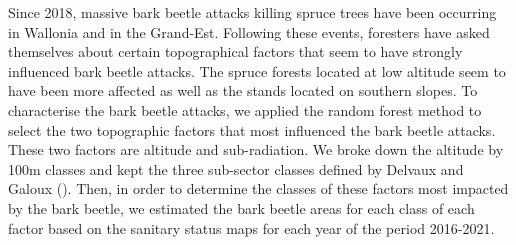 \documentclass[3p,times]{elsarticle}
\begin{document}









Since 2018, massive bark beetle attacks killing spruce trees have been occurring in Wallonia and in the Grand-Est. Following these events, foresters have asked themselves about certain topographical factors that seem to have strongly influenced bark beetle attacks. 
The spruce forests located at low altitude seem to have been more affected as well as the stands located on southern slopes.
To characterise the bark beetle attacks, we applied the random forest method to select the two topographic factors that most influenced the bark beetle attacks. These two factors are altitude and sub-radiation. We broke down the altitude by 100m classes and kept the three sub-sector classes defined by Delvaux and Galoux (\citep{Delvaux_galoux}).
Then, in order to determine the classes of these factors most impacted by the bark beetle, we estimated the bark beetle areas for each class of each factor based on the sanitary status maps for each year of the period 2016-2021.
\end{document}
